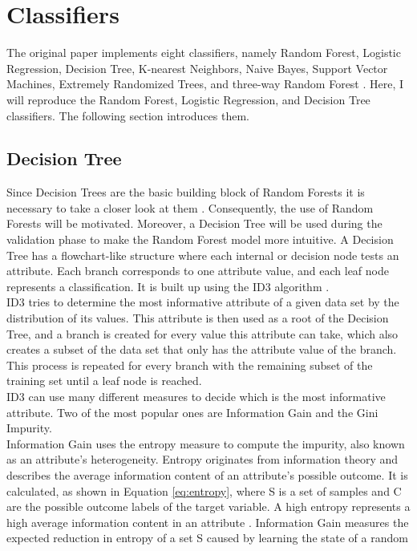 \section{Classifiers}
The original paper implements eight classifiers, namely Random 
Forest, Logistic Regression, Decision Tree, K-nearest Neighbors, Naive Bayes, 
Support Vector Machines, Extremely Randomized Trees, and three-way Random 
Forest \cite{RN127}. 
Here, I will reproduce the Random Forest, Logistic Regression, and Decision 
Tree classifiers. The following section introduces them.
\subsection{Decision Tree}
Since Decision Trees are the basic building block of Random Forests it 
is necessary to take a closer look at them \cite{RN163}. Consequently, the use 
of Random Forests will be motivated. Moreover, a Decision Tree will be used 
during the validation phase to make the Random Forest model more intuitive.
A Decision Tree has a flowchart-like structure where each internal or decision 
node tests an attribute. Each branch corresponds to one attribute value, and 
each leaf node represents a classification. It is built up using the ID3 
algorithm \cite{RN171}.
\\
ID3 tries to determine the most informative attribute of a given data set by 
the distribution of its values. This attribute is then used as a root of the 
Decision Tree, and a branch is created for every value this attribute can take, 
which also creates a subset of the data set that only has the attribute value 
of the branch. This process is repeated for every branch with the remaining 
subset of the training set until a leaf node is reached. \cite{RN165}
\\
ID3 can use many different measures to decide which is the most informative 
attribute. Two of the most popular ones are Information Gain and the Gini 
Impurity.
\\
Information Gain uses the entropy measure to compute the impurity, also known 
as an attribute's heterogeneity. Entropy originates from information 
theory and describes the average information content of an attribute's possible 
outcome. It is calculated, as shown in Equation \ref{eq:entropy}, where S is a 
set of samples and C are the possible outcome labels of the target variable. A 
high entropy represents a high average 
information content in an attribute \cite{RN167}. Information Gain measures the 
expected 
reduction in entropy of a set S caused by learning the state of a random 
